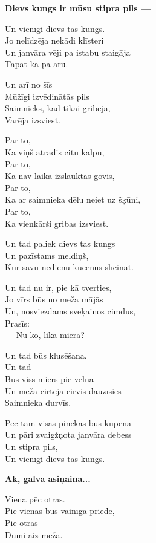 \documentclass[14pt]{extarticle}
\begin{document}
\newpage

{\bf Dievs kungs ir mūsu stipra pils ---}

Un vienīgi dievs tas kungs.\\
Jo nelīdzēja nekādi klīsteri\\
Un janvāra vēji pa istabu staigāja\\
Tāpat kā pa āru.

Un arī no šīs\\
Mūžīgi izvēdinātās pils\\
Saimnieks, kad tikai gribēja,\\
Varēja izsviest.

Par to,\\
Ka viņš atradis citu kalpu,\\
Par to,\\
Ka nav laikā izslauktas govis,\\
Par to,\\
Ka ar saimnieka dēlu neiet uz šķūni,\\
Par to,\\
Ka vienkārši gribas izsviest.

Un tad paliek dievs tas kungs\\
Un pazīstams meldiņš,\\
Kur savu nedienu kucēnus slīcināt.

Un tad nu ir, pie kā tverties,\\
Jo vīrs būs no meža mājās\\
Un, nosviezdams sveķainos cimdus,\\
Prasīs:\\
--- Nu ko, lika mierā? ---

Un tad būs klusēšana.\\
Un tad ---\\
Būs viss miers pie velna\\
Un meža cirtēja cirvis dauzīsies\\
Saimnieka durvīs.

Pēc tam visas pinckas būs kupenā\\
Un pāri zvaigžņota janvāra debess\\
Un stipra pils,\\
Un vienīgi dievs tas kungs.


\newpage 

{\bf Ak, galva asiņaina...}

Viena pēc otras.\\
Pie vienas būs vainīga priede,\\
Pie otras ---\\
Dūmi aiz meža.
\end{document}
